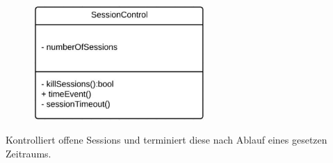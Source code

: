 \begin{itemize}
\begin{itemize}
                    \newpage
                    \begin{figure}[htb]
                    \centering
                    \includegraphics[width=6.5cm]{Diagramms/class/singleclass/ControlSession.pdf}
                    \end{figure}
                        Kontrolliert offene Sessions und terminiert diese nach Ablauf eines gesetzen Zeitraums.
                        \begin{itemize}
                        \end{itemize}
                \end{itemize}

            \begin{itemize}
                 \itm{}
            \end{itemize}

        \end{itemize}

